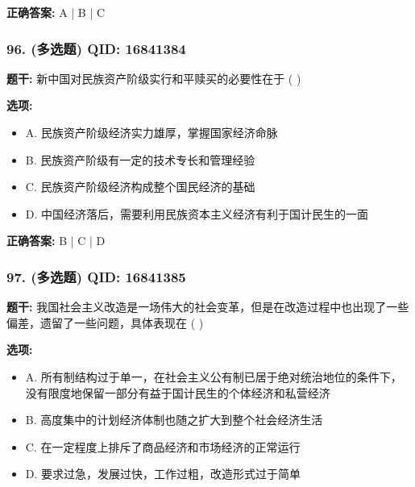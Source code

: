 \documentclass[12pt,UTF8]{ctexart}
\begin{document}
\textbf{正确答案:}
A | B | C

\vspace{0.3em}\hrulefill\vspace{0.7em}

\subsubsection*{96. (多选题) \small QID: 16841384}

\textbf{题干:}
新中国对民族资产阶级实行和平赎买的必要性在于 ( )

\textbf{选项:}
\begin{itemize}[leftmargin=*]

  \item A. 民族资产阶级经济实力雄厚，掌握国家经济命脉

  \item B. 民族资产阶级有一定的技术专长和管理经验

  \item C. 民族资产阶级经济构成整个国民经济的基础

  \item D. 中国经济落后，需要利用民族资本主义经济有利于国计民生的一面

\end{itemize}

\textbf{正确答案:}
B | C | D

\vspace{0.3em}\hrulefill\vspace{0.7em}

\subsubsection*{97. (多选题) \small QID: 16841385}

\textbf{题干:}
我国社会主义改造是一场伟大的社会变革，但是在改造过程中也出现了一些偏差，遗留了一些问题，具体表现在 ( )

\textbf{选项:}
\begin{itemize}[leftmargin=*]

  \item A. 所有制结构过于单一，在社会主义公有制已居于绝对统治地位的条件下，没有限度地保留一部分有益于国计民生的个体经济和私营经济

  \item B. 高度集中的计划经济体制也随之扩大到整个社会经济生活

  \item C. 在一定程度上排斥了商品经济和市场经济的正常运行

  \item D. 要求过急，发展过快，工作过粗，改造形式过于简单

\end{itemize}
\end{document}
